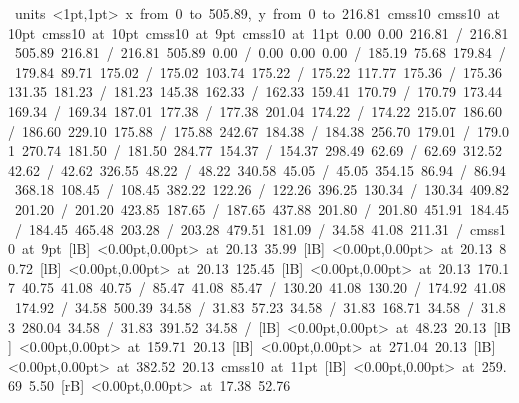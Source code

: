 \hbox{\beginpicture
\setcoordinatesystem units <1pt,1pt>
\setplotarea x from 0 to 505.89, y from 0 to 216.81
\setlinear
\font\picfont cmss10\picfont
\font\picfont cmss10 at 10pt\picfont
\font\picfont cmss10 at 10pt\picfont
\font\picfont cmss10 at 9pt\picfont
\font\picfont cmss10 at 11pt\picfont
\setsolid
{} 0.00 0.00 216.81 /
 216.81 505.89 216.81 /
 216.81 505.89 0.00 /
 0.00 0.00 0.00 /
\setsolid
{} 185.19 75.68 179.84 /
 179.84 89.71 175.02 /
 175.02 103.74 175.22 /
 175.22 117.77 175.36 /
 175.36 131.35 181.23 /
 181.23 145.38 162.33 /
 162.33 159.41 170.79 /
 170.79 173.44 169.34 /
 169.34 187.01 177.38 /
 177.38 201.04 174.22 /
 174.22 215.07 186.60 /
 186.60 229.10 175.88 /
 175.88 242.67 184.38 /
 184.38 256.70 179.01 /
 179.01 270.74 181.50 /
 181.50 284.77 154.37 /
 154.37 298.49 62.69 /
 62.69 312.52 42.62 /
 42.62 326.55 48.22 /
 48.22 340.58 45.05 /
 45.05 354.15 86.94 /
 86.94 368.18 108.45 /
 108.45 382.22 122.26 /
 122.26 396.25 130.34 /
 130.34 409.82 201.20 /
 201.20 423.85 187.65 /
 187.65 437.88 201.80 /
 201.80 451.91 184.45 /
 184.45 465.48 203.28 /
 203.28 479.51 181.09 /
\setsolid
{} 34.58 41.08 211.31 /
\font\picfont cmss10 at 9pt\picfont
{}  [lB] <0.00pt,0.00pt> at 20.13 35.99
  [lB] <0.00pt,0.00pt> at 20.13 80.72
  [lB] <0.00pt,0.00pt> at 20.13 125.45
  [lB] <0.00pt,0.00pt> at 20.13 170.17
\setsolid
{} 40.75 41.08 40.75 /
\setsolid
{} 85.47 41.08 85.47 /
\setsolid
{} 130.20 41.08 130.20 /
\setsolid
{} 174.92 41.08 174.92 /
\setsolid
{} 34.58 500.39 34.58 /
\setsolid
{} 31.83 57.23 34.58 /
\setsolid
{} 31.83 168.71 34.58 /
\setsolid
{} 31.83 280.04 34.58 /
\setsolid
{} 31.83 391.52 34.58 /
  [lB] <0.00pt,0.00pt> at 48.23 20.13
  [lB] <0.00pt,0.00pt> at 159.71 20.13
  [lB] <0.00pt,0.00pt> at 271.04 20.13
  [lB] <0.00pt,0.00pt> at 382.52 20.13
\font\picfont cmss10 at 11pt\picfont
{}  [lB] <0.00pt,0.00pt> at 259.69 5.50
 [rB] <0.00pt,0.00pt> at 17.38 52.76
\endpicture
}
